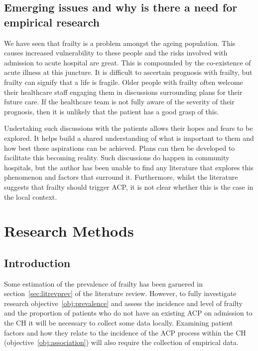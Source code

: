 \documentclass
[
	12pt,
	a4paper,
	oneside,
]{report}
\begin{document}
\section{Emerging issues and why is there a need for empirical 
research}

We have seen that frailty is a problem amongst the ageing population.
This causes increased vulnerability to these people and the risks involved with 
admission to acute hospital are great. This is compounded by the co-existence
of acute illness at this juncture. It is difficult to ascertain prognosis with 
frailty, but frailty can signify that a life is fragile. Older people with 
frailty often welcome their healthcare staff engaging them in discussions 
surrounding plans for their future care. If the healthcare team is not fully
aware of the severity of their prognosis, then it is unlikely that the patient
has a good grasp of this. 

Undertaking such discussions with the patients allows their hopes and fears to
be explored. It helps build a shared understanding of what is important to
them and how best these aspirations can be achieved. Plans can then be 
developed to facilitate this becoming reality. Such discussions do happen in
community hospitals, but the author has been unable to find any literature
that explores this phenomenon and factors that surround it. Furthermore, whilst
the literature suggests that frailty should trigger ACP, it is not clear
whether this is the case in the local context.

\chapter{Research Methods}
 
\section{Introduction}

Some estimation of the prevalence of frailty has been garnered in 
section~\ref{sec:litrevprev} of the literature review. However, to fully
investigate research objective~\ref{obj:prevalence} and assess the incidence
and level of frailty and the proportion of patients who do not have an
existing ACP on admission to the CH it will be necessary to collect some
data locally. Examining patient factors and how they relate to the incidence of
the ACP process within the CH (objective~\ref{obj:association}) will
also require the collection of empirical data.
\end{document}
